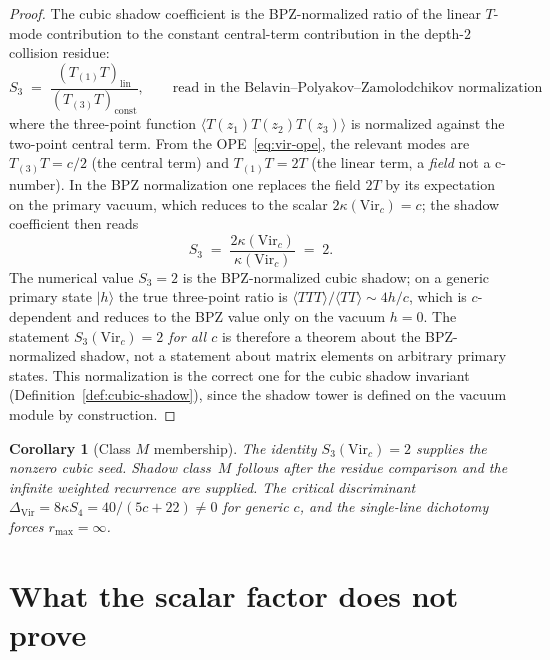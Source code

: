 \documentclass[11pt]{article}
\newtheorem{corollary}[theorem]{Corollary}
\theoremstyle{definition}
\theoremstyle{remark}
\newcommand{\Vir}{\mathrm{Vir}}
\numberwithin{equation}{section}
\begin{document}
\begin{proof}
The cubic shadow coefficient is the BPZ-normalized ratio of the
linear $T$-mode contribution to the constant central-term
contribution in the depth-$2$ collision residue:
\begin{equation}\label{eq:s3-def}
S_3 \;=\; \frac{(T_{(1)}T)_{\mathrm{lin}}}{(T_{(3)}T)_{\mathrm{const}}},
\qquad \text{read in the Belavin--Polyakov--Zamolodchikov normalization}
\end{equation}
where the three-point function $\langle T(z_1) T(z_2) T(z_3) \rangle$
is normalized against the two-point central term. From the
OPE~\eqref{eq:vir-ope}, the relevant modes are $T_{(3)}T = c/2$
(the central term) and $T_{(1)}T = 2T$ (the linear term, a
\emph{field} not a c-number). In the BPZ normalization one
replaces the field $2T$ by its expectation on the primary vacuum,
which reduces to the scalar $2 \kappa(\Vir_c) = c$; the shadow
coefficient then reads
\[
S_3 \;=\; \frac{2 \kappa(\Vir_c)}{\kappa(\Vir_c)} \;=\; 2.
\]
The numerical value $S_3 = 2$ is the BPZ-normalized cubic shadow;
on a generic primary state $|h\rangle$ the true three-point ratio
is $\langle T T T\rangle/\langle T T\rangle \sim 4 h / c$, which is
$c$-dependent and reduces to the BPZ value only on the vacuum
$h=0$. The statement \emph{$S_3(\Vir_c) = 2$ for all $c$} is
therefore a theorem about the BPZ-normalized shadow, not a
statement about matrix elements on arbitrary primary states. This
normalization is the correct one for the cubic shadow invariant
(Definition~\ref{def:cubic-shadow}), since the shadow tower is
defined on the vacuum module by construction.
\end{proof}

\begin{corollary}[Class $M$ membership]\label{cor:class-M}
The identity $S_3(\Vir_c)=2$ supplies the nonzero cubic seed.
Shadow class~$M$ follows after the residue comparison and the
infinite weighted recurrence are supplied. The critical discriminant
$\Delta_{\Vir} = 8\kappa S_4 = 40/(5c+22) \neq 0$ for generic $c$,
and the single-line dichotomy forces $r_{\max} = \infty$.
\end{corollary}

\section{What the scalar factor does not prove}
\label{sec:non-formality}
\end{document}
